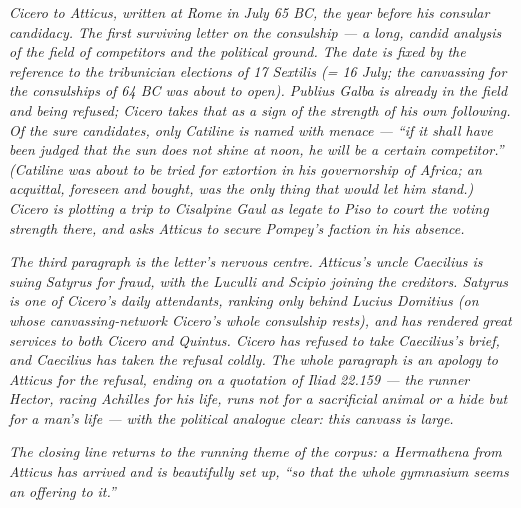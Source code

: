 
\textit{Cicero to Atticus, written at Rome in July 65 BC,
the year before his consular candidacy. The first surviving
letter on the consulship --- a long, candid analysis of
the field of competitors and the political ground. The
date is fixed by the reference to the tribunician elections
of 17 Sextilis (= 16 July; the canvassing for the
consulships of 64 BC was about to open). Publius Galba is
already in the field and being refused; Cicero takes that
as a sign of the strength of his own following. Of the
sure candidates, only Catiline is named with menace ---
``if it shall have been judged that the sun does not shine
at noon, he will be a certain competitor.'' (Catiline was
about to be tried for extortion in his governorship of
Africa; an acquittal, foreseen and bought, was the only
thing that would let him stand.) Cicero is plotting a
trip to Cisalpine Gaul as legate to Piso to court the
voting strength there, and asks Atticus to secure
Pompey's faction in his absence.}

\textit{The third paragraph is the letter's nervous
centre. Atticus's uncle Caecilius is suing Satyrus for
fraud, with the Luculli and Scipio joining the creditors.
Satyrus is one of Cicero's daily attendants, ranking only
behind Lucius Domitius (on whose canvassing-network
Cicero's whole consulship rests), and has rendered great
services to both Cicero and Quintus. Cicero has refused
to take Caecilius's brief, and Caecilius has taken the
refusal coldly. The whole paragraph is an apology to
Atticus for the refusal, ending on a quotation of
\textit{Iliad} 22.159 --- the runner Hector, racing
Achilles for his life, runs not for a sacrificial animal
or a hide but for a man's life --- with the political
analogue clear: this canvass is large.}

\textit{The closing line returns to the running theme of
the corpus: a Hermathena from Atticus has arrived and is
beautifully set up, ``so that the whole gymnasium seems
an offering to it.''}
